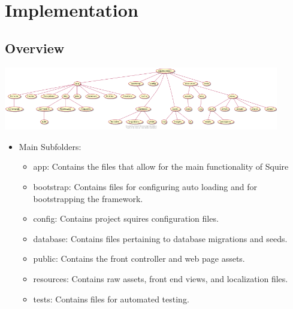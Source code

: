 \documentclass[11pt]{report}
\begin{document}

\chapter{Implementation}
    \section{Overview}
    \begin{minipage}{1\textwidth}
        \begin{center}
            \includegraphics[width=0.9\textwidth]{diagrams/folders-overview-max}
        \end{center}
    \end{minipage}
    
    \begin{itemize}
        \item Main Subfolders:
        \begin{itemize}
            \item app: Contains the files that allow for the main functionality of Squire
            \item bootstrap: Contains files for configuring auto loading and for bootstrapping the framework.
            \item config: Contains project squires configuration files.
            \item database: Contains files pertaining to database migrations and seeds.
            \item public: Contains the front controller and web page assets.
            \item resources: Contains raw assets, front end views, and localization files.
            \item tests: Contains files for automated testing.
        \end{itemize}
    \end{itemize}
    
\end{document}
